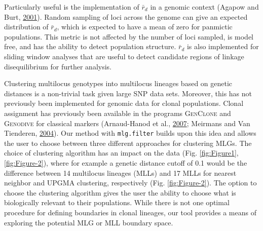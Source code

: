 \documentclass[double,12pt]{beavtex}
\begin{document}
  Particularly useful is the implementation of \(\bar{r}_d\) in a genomic
  context (Agapow and Burt, \protect\hyperlink{ref-Agapow_2001}{2001}).
  Random sampling of loci across the genome can give an expected
  distribution of \(\bar{r}_d\), which is expected to have a mean of zero
  for panmictic populations. This metric is not affected by the number of
  loci sampled, is model free, and has the ability to detect population
  structure. \(\bar{r}_d\) is also implemented for sliding window analyses
  that are useful to detect candidate regions of linkage disequilibrium
  for further analysis.
  
  Clustering multilocus genotypes into multilocus lineages based on
  genetic distances is a non-trivial task given large SNP data sets.
  Moreover, this has not previously been implemented for genomic data for
  clonal populations. Clonal assignment has previously been available in
  the programs \textsc{GenClone} and \textsc{Genodive} for classical
  markers (Arnaud-Hanod et al.,
  \protect\hyperlink{ref-arnaud2007standardizing}{2007}; Meirmans and Van
  Tienderen, \protect\hyperlink{ref-meirmans2004genotype}{2004}). Our
  method with \texttt{mlg.filter} builds upon this idea and allows the
  user to choose between three different approaches for clustering MLGs.
  The choice of clustering algorithm has an impact on the data (Fig.
  \ref{fig:Figure1}, \ref{fig:Figure-2}), where for example a genetic
  distance cutoff of 0.1 would be the difference between 14 multilocus
  lineages (MLLs) and 17 MLLs for nearest neighbor and UPGMA clustering,
  respectively (Fig. \ref{fig:Figure-2}). The option to choose the
  clustering algorithm gives the user the ability to choose what is
  biologically relevant to their populations. While there is not one
  optimal procedure for defining boundaries in clonal lineages, our tool
  provides a means of exploring the potential MLG or MLL boundary space.
  
\end{document}
